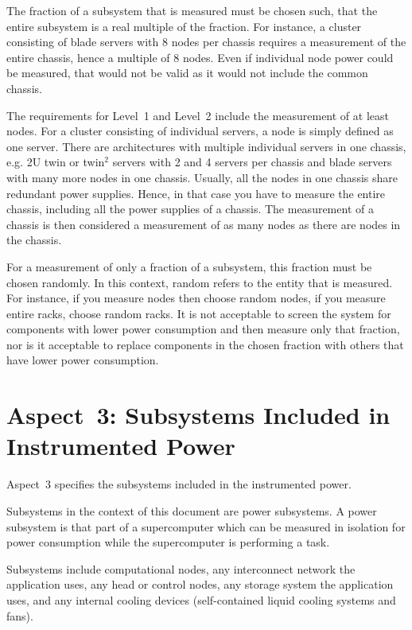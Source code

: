 \noindent
The fraction of a subsystem that is measured must be chosen such, that the entire subsystem is a real multiple of the fraction.
For instance, a cluster consisting of blade servers with 8 nodes per chassis requires a measurement of the entire chassis, hence a multiple of 8 nodes.
Even if individual node power could be measured, that would not be valid as it would not include the common chassis.
\wl

\noindent
The requirements for Level~1 and Level~2 include the measurement of at least \SpecMinNodes{} nodes.
For a cluster consisting of individual servers, a node is simply defined as one server.
There are architectures with multiple individual servers in one chassis, e.g.
2U twin or twin$^2$ servers with 2 and 4 servers per chassis and blade servers with many more nodes in one chassis.
Usually, all the nodes in one chassis share redundant power supplies.
Hence, in that case you have to measure the entire chassis, including all the power supplies of a chassis.
The measurement of a chassis is then considered a measurement of as many nodes as there are nodes in the chassis.
\wl

\noindent
For a measurement of only a fraction of a subsystem, this fraction must be chosen randomly.
In this context, random refers to the entity that is measured.
For instance, if you measure nodes then choose random nodes, if you measure entire racks, choose random racks.
It is not acceptable to screen the system for components with lower power consumption and then measure only that fraction, nor is it acceptable to replace components in the chosen fraction with others that have lower power consumption.
\wl

\section{Aspect~3: Subsystems Included in Instrumented Power}
\label{sec:A3SIiIP}
\noindent
Aspect~3 specifies the subsystems included in the instrumented power.
\wl

\noindent
Subsystems in the context of this document are power subsystems.
A power subsystem is that part of a supercomputer which can be measured in isolation for power consumption while the supercomputer is performing a task.
\wl

\noindent
Subsystems include computational nodes, any interconnect network the application uses, any head or control nodes, any storage system the application uses, and any internal cooling devices (self-contained liquid cooling systems and fans).
\wl

